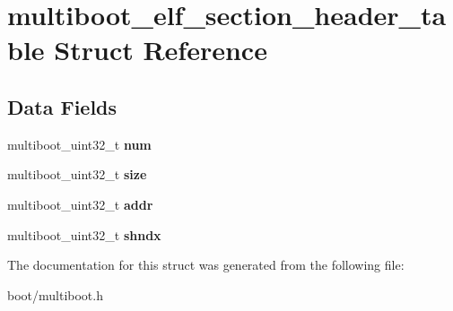 \hypertarget{structmultiboot__elf__section__header__table}{
\section{multiboot\_\-elf\_\-section\_\-header\_\-table Struct Reference}
\label{structmultiboot__elf__section__header__table}
}
\subsection*{Data Fields}
\begin{DoxyCompactItemize}
\item 
\hypertarget{structmultiboot__elf__section__header__table_ac7a3ee82a45af6c3c10413de7620eec2}{
multiboot\_\-uint32\_\-t {\bfseries num}}
\label{structmultiboot__elf__section__header__table_ac7a3ee82a45af6c3c10413de7620eec2}

\item 
\hypertarget{structmultiboot__elf__section__header__table_a87bed62f532b2e2e73ab41df40069e2a}{
multiboot\_\-uint32\_\-t {\bfseries size}}
\label{structmultiboot__elf__section__header__table_a87bed62f532b2e2e73ab41df40069e2a}

\item 
\hypertarget{structmultiboot__elf__section__header__table_ad0c7bb0937470de83f3319015416614a}{
multiboot\_\-uint32\_\-t {\bfseries addr}}
\label{structmultiboot__elf__section__header__table_ad0c7bb0937470de83f3319015416614a}

\item 
\hypertarget{structmultiboot__elf__section__header__table_adfc74c974ba232064320ba57a02d0fb3}{
multiboot\_\-uint32\_\-t {\bfseries shndx}}
\label{structmultiboot__elf__section__header__table_adfc74c974ba232064320ba57a02d0fb3}

\end{DoxyCompactItemize}


The documentation for this struct was generated from the following file:\begin{DoxyCompactItemize}
\item 
boot/multiboot.h\end{DoxyCompactItemize}
